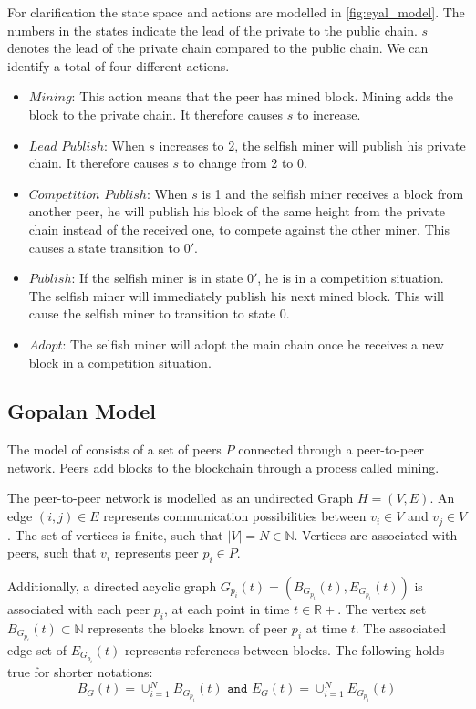 For clarification the state space and actions are modelled in \ref{fig:eyal_model}. The numbers in the states indicate the lead of the private to the public chain. $s$ denotes the lead of the private chain compared to the public chain. We can identify a total of four different actions.
\begin{itemize}
\item $Mining$: This action means that the peer has mined block. Mining adds the block to the private chain. It therefore causes $s$ to increase.
\item $Lead$ $Publish$: When $s$ increases to 2, the selfish miner will publish his private chain. It therefore causes $s$ to change from 2 to 0.
\item $Competition$ $Publish$: When $s$ is 1 and the selfish miner receives a block from another peer, he will publish his block of the same height from the private chain instead of the received one, to compete against the other miner. This causes a state transition to $0'$.
\item $Publish$: If the selfish miner is in state $0'$, he is in a competition situation.
The selfish miner will immediately publish his next mined block. This will cause the selfish miner to transition to state $0$.
\item $Adopt$: The selfish miner will adopt the main chain once he receives a new block in a competition situation.
\end{itemize}

\subsection{Gopalan Model}\label{gopalan}
The model of \citeauthor{gopalan} consists of a set of peers $P$ connected through a peer-to-peer network. Peers add blocks to the blockchain through a process called mining. 

The peer-to-peer network is modelled as an undirected Graph $H = (V,E)$.
An edge $(i,j) \in E$ represents communication possibilities between $v_i \in V$ and $v_j \in V$. 
The set of vertices is finite, such that $|V|=N \in \mathbb{N}$.
Vertices are associated with peers, such that $v_i$ represents peer $p_i \in P$.

Additionally, a directed acyclic graph $G_{p_i}(t) = (B_{G_{p_i}}(t),E_{G_{p_i}}(t))$ is associated with each peer $p_i$, at each point in time $t \in \mathbb{R+}$.
The vertex set $B_{G_{p_i}}(t) \subset \mathbb{N}$ represents the blocks known of peer $p_i$ at time $t$. The associated edge set of $E_{G_{p_i}}(t)$ represents references between blocks.
The following holds true for shorter notations:
\begin{equation}
B_G(t) = \cup_{i=1}^N B_{G_{p_i}}(t) \texttt{ and } E_G(t) = \cup_{i=1}^N E_{G_{p_i}}(t)
\end{equation}

